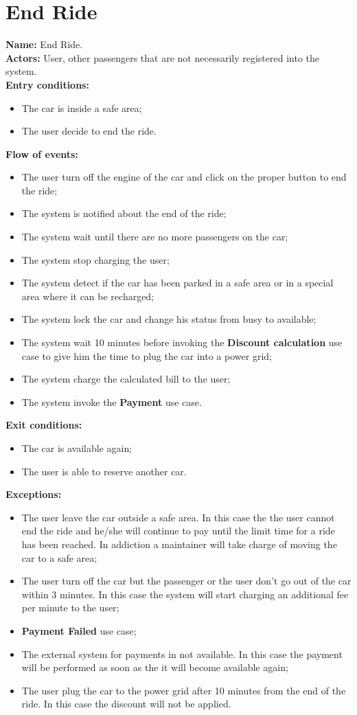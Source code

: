 \section*{End Ride}
\textbf{Name:} End Ride.\\
\textbf{Actors:} User, other passengers that are not necessarily registered into the system.\\
\textbf{Entry conditions:}
\begin{itemize}
\item The car is inside a safe area;
\item The user decide to end the ride.
\end{itemize}
\textbf{Flow of events:}
\begin{itemize}
\item The user turn off the engine of the car and click on the proper button to end the ride;
\item The system is notified about the end of the ride;
\item The system wait until there are no more passengers on the car;
\item The system stop charging the user;
\item The system detect if the car has been parked in a safe area or in a special area where it can be recharged;
\item The system lock the car and change his status from busy to available;
\item The system wait 10 minutes before invoking the \textbf{Discount calculation} use case to give him the time to plug the car into a power grid;
\item The system charge the calculated bill to the user;
\item The system invoke the \textbf{Payment} use case.
\end{itemize}
\textbf{Exit conditions:}
\begin{itemize}
\item The car is available again;
\item The user is able to reserve another car.
\end{itemize}
\textbf{Exceptions:}
\begin{itemize}
\item The user leave the car outside a safe area. In this case the the user cannot end the ride and he/she will continue to pay until the limit time for a ride has been reached. In addiction a maintainer will take charge of moving the car to a safe area;
\item The user turn off the car but the passenger or the user don't go out of the car within 3 minutes. In this case the system will start charging an additional fee per minute to the user;
\item\textbf{Payment Failed} use case;
\item The external system for payments in not available. In this case the payment will be performed as soon as the it will become available again;
\item The user plug the car to the power grid after 10 minutes from the end of the ride. In this case the discount will not be applied.
\end{itemize}

